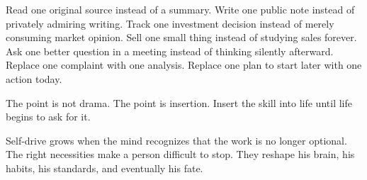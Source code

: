 Read one original source instead of a summary. Write one public note instead of privately admiring writing. Track one investment decision instead of merely consuming market opinion. Sell one small thing instead of studying sales forever. Ask one better question in a meeting instead of thinking silently afterward. Replace one complaint with one analysis. Replace one plan to start later with one action today.

The point is not drama. The point is insertion. Insert the skill into life until life begins to ask for it.

Self-drive grows when the mind recognizes that the work is no longer optional. The right necessities make a person difficult to stop. They reshape his brain, his habits, his standards, and eventually his fate.
